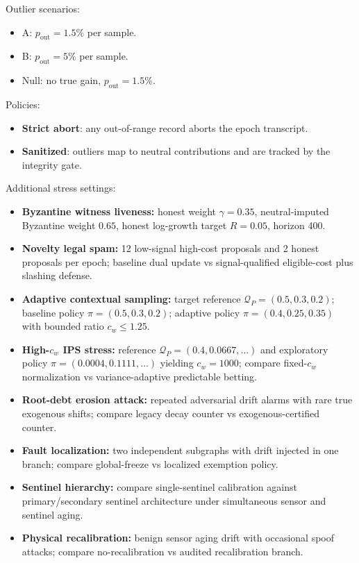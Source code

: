 \documentclass[11pt,a4paper]{article}
\begin{document}
Outlier scenarios:
\begin{itemize}[leftmargin=*]
\item A: $p_{\mathrm{out}}=1.5\%$ per sample.
\item B: $p_{\mathrm{out}}=5\%$ per sample.
\item Null: no true gain, $p_{\mathrm{out}}=1.5\%$.
\end{itemize}

Policies:
\begin{itemize}[leftmargin=*]
\item \textbf{Strict abort}: any out-of-range record aborts the epoch transcript.
\item \textbf{Sanitized}: outliers map to neutral contributions and are tracked by the integrity gate.
\end{itemize}

Additional stress settings:
\begin{itemize}[leftmargin=*]
\item \textbf{Byzantine witness liveness:} honest weight $\gamma=0.35$, neutral-imputed Byzantine weight $0.65$, honest log-growth target $R=0.05$, horizon 400.
\item \textbf{Novelty legal spam:} 12 low-signal high-cost proposals and 2 honest proposals per epoch; baseline dual update vs signal-qualified eligible-cost plus slashing defense.
\item \textbf{Adaptive contextual sampling:} target reference $\mathcal{Q}_P=(0.5,0.3,0.2)$; baseline policy $\pi=(0.5,0.3,0.2)$; adaptive policy $\pi=(0.4,0.25,0.35)$ with bounded ratio $c_w\le1.25$.
\item \textbf{High-$c_w$ IPS stress:} reference $\mathcal{Q}_P=(0.4,0.0667,\dots)$ and exploratory policy $\pi=(0.0004,0.1111,\dots)$ yielding $c_w=1000$; compare fixed-$c_w$ normalization vs variance-adaptive predictable betting.
\item \textbf{Root-debt erosion attack:} repeated adversarial drift alarms with rare true exogenous shifts; compare legacy decay counter vs exogenous-certified counter.
\item \textbf{Fault localization:} two independent subgraphs with drift injected in one branch; compare global-freeze vs localized exemption policy.
\item \textbf{Sentinel hierarchy:} compare single-sentinel calibration against primary/secondary sentinel architecture under simultaneous sensor and sentinel aging.
\item \textbf{Physical recalibration:} benign sensor aging drift with occasional spoof attacks; compare no-recalibration vs audited recalibration branch.
\end{itemize}
\end{document}
